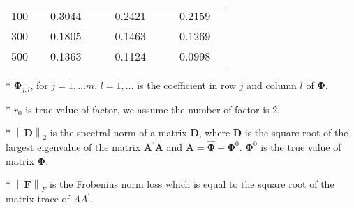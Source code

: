 \documentclass[12pt,a4paper,hyperref]{article}
\begin{document}
\begin{table}[H]
\begin{threeparttable}
\begin{tabular} {*{10}{c}}
\cmidrule(lr){1-4}   \cmidrule(lr){5-7}   \cmidrule(lr){8-10}
100& & 0.3044& &  &0.2421 & & & 0.2159& \\
300& &0.1805 & &  & 0.1463& & &0.1269 &\\
500& & 0.1363& &  &0.1124& & & 0.0998& \\
\bottomrule
\end{tabular}
\begin{tablenotes}
\footnotesize
  \item[*] $\boldsymbol{\Phi}_{j,l}$, for $j=1,\ldots m$, $l=1,\ldots$ is the coefficient in row $j$ and column $l$ of $\boldsymbol{\Phi}$.
\item[*] $r_{0}$ is true value of factor, we assume the number of factor is $2$.
 \item[*] $\left\| \boldsymbol{D} \right\|_{2}$ is the spectral norm of a matrix $\boldsymbol{D}$, where $\boldsymbol{D}$ is the square root of the largest eigenvalue of the matrix $\boldsymbol{A}^{'}\boldsymbol{A}$ and $\boldsymbol{A}=\hat{\boldsymbol{\Phi}}- \boldsymbol{\Phi}^{0}$. $\boldsymbol{\Phi}^{0}$ is the true value of matrix $\boldsymbol{\Phi}$.
 \item[*] $\left\| \boldsymbol{F} \right\|_{F} $ is the Frobenius norm loss which is equal to the square root of the matrix trace of $AA^{'}$.
    \end{tablenotes}
\end{threeparttable}
\end{table}
\end{document}
